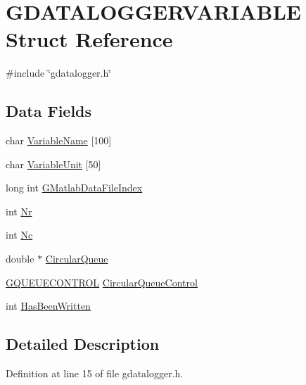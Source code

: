 \hypertarget{structGDATALOGGERVARIABLE}{\section{G\-D\-A\-T\-A\-L\-O\-G\-G\-E\-R\-V\-A\-R\-I\-A\-B\-L\-E Struct Reference}
\label{structGDATALOGGERVARIABLE}
}


{\ttfamily \#include \char`\"{}gdatalogger.\-h\char`\"{}}

\subsection*{Data Fields}
\begin{DoxyCompactItemize}
\item 
char \hyperlink{structGDATALOGGERVARIABLE_a336b7b6cbfc9cdebc7e1ade3de17ac3f}{Variable\-Name} \mbox{[}100\mbox{]}
\item 
char \hyperlink{structGDATALOGGERVARIABLE_a0d42da63f3f904774cbf2ee8d92ee135}{Variable\-Unit} \mbox{[}50\mbox{]}
\item 
long int \hyperlink{structGDATALOGGERVARIABLE_aa1cd5b838d8655734e7d4499b25bf22a}{G\-Matlab\-Data\-File\-Index}
\item 
int \hyperlink{structGDATALOGGERVARIABLE_a68c3eb0f57a786afe9a2658fc42b61d6}{Nr}
\item 
int \hyperlink{structGDATALOGGERVARIABLE_abd1db7599f09e121cd125e665cb9c460}{Nc}
\item 
double $\ast$ \hyperlink{structGDATALOGGERVARIABLE_ae17ad02442f31da9518c99ce13607c8b}{Circular\-Queue}
\item 
\hyperlink{structGQUEUECONTROL}{G\-Q\-U\-E\-U\-E\-C\-O\-N\-T\-R\-O\-L} \hyperlink{structGDATALOGGERVARIABLE_a1a50747d2223f228288b4656470d9bbc}{Circular\-Queue\-Control}
\item 
int \hyperlink{structGDATALOGGERVARIABLE_ad982aef10e8496c2a1c6b9bb1f1dc5c3}{Has\-Been\-Written}
\end{DoxyCompactItemize}


\subsection{Detailed Description}


Definition at line 15 of file gdatalogger.\-h.



